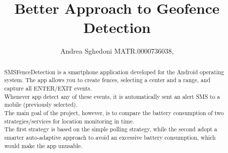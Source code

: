 \documentclass[conference]{IEEEtran}
\begin{document}
\title{Better Approach to Geofence Detection}

\author{
Andrea Sghedoni MATR.0000736038,
\\
}




\maketitle

\begin{abstract}
SMSFenceDetection is a smartphone application developed for the Android operating system.
The app allows you to create fences, selecting a center and a range, and capture all ENTER/EXIT events.\\
Whenever app detect any of these events, it is automatically sent an alert SMS to a mobile (previously selected).\\
The main goal of the project, however, is to compare the battery consumption of two strategies/services for location monitoring in time.\\
The first strategy is based on the simple polling strategy, while the second adopt a smarter auto-adaptive approach to avoid an excessive battery consumption, which would make the app unusable.

\end{abstract}
\end{document}
